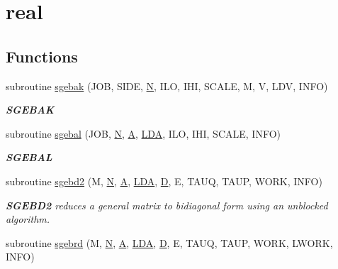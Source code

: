 \hypertarget{group__realGEcomputational}{}\section{real}
\label{group__realGEcomputational}
\subsection*{Functions}
\begin{DoxyCompactItemize}
\item 
subroutine \hyperlink{group__realGEcomputational_gad036a50aafd810967583ed8854e6cd3a}{sgebak} (J\+O\+B, S\+I\+D\+E, \hyperlink{polmisc_8c_a0240ac851181b84ac374872dc5434ee4}{N}, I\+L\+O, I\+H\+I, S\+C\+A\+L\+E, M, V, L\+D\+V, I\+N\+F\+O)
\begin{DoxyCompactList}\small\item\em {\bfseries S\+G\+E\+B\+A\+K} \end{DoxyCompactList}\item 
subroutine \hyperlink{group__realGEcomputational_ga5d3d13fe83e675d743f67f6afdd94041}{sgebal} (J\+O\+B, \hyperlink{polmisc_8c_a0240ac851181b84ac374872dc5434ee4}{N}, \hyperlink{classA}{A}, \hyperlink{example__user_8c_ae946da542ce0db94dced19b2ecefd1aa}{L\+D\+A}, I\+L\+O, I\+H\+I, S\+C\+A\+L\+E, I\+N\+F\+O)
\begin{DoxyCompactList}\small\item\em {\bfseries S\+G\+E\+B\+A\+L} \end{DoxyCompactList}\item 
subroutine \hyperlink{group__realGEcomputational_ga852b6c5f1ed8ffe46a79b504e7e03e3f}{sgebd2} (M, \hyperlink{polmisc_8c_a0240ac851181b84ac374872dc5434ee4}{N}, \hyperlink{classA}{A}, \hyperlink{example__user_8c_ae946da542ce0db94dced19b2ecefd1aa}{L\+D\+A}, \hyperlink{odrpack_8h_a7dae6ea403d00f3687f24a874e67d139}{D}, E, T\+A\+U\+Q, T\+A\+U\+P, W\+O\+R\+K, I\+N\+F\+O)
\begin{DoxyCompactList}\small\item\em {\bfseries S\+G\+E\+B\+D2} reduces a general matrix to bidiagonal form using an unblocked algorithm. \end{DoxyCompactList}\item 
subroutine \hyperlink{group__realGEcomputational_gaa7ed93332ee7ff7ab268080a453615b6}{sgebrd} (M, \hyperlink{polmisc_8c_a0240ac851181b84ac374872dc5434ee4}{N}, \hyperlink{classA}{A}, \hyperlink{example__user_8c_ae946da542ce0db94dced19b2ecefd1aa}{L\+D\+A}, \hyperlink{odrpack_8h_a7dae6ea403d00f3687f24a874e67d139}{D}, E, T\+A\+U\+Q, T\+A\+U\+P, W\+O\+R\+K, L\+W\+O\+R\+K, I\+N\+F\+O)

\end{DoxyCompactItemize}
